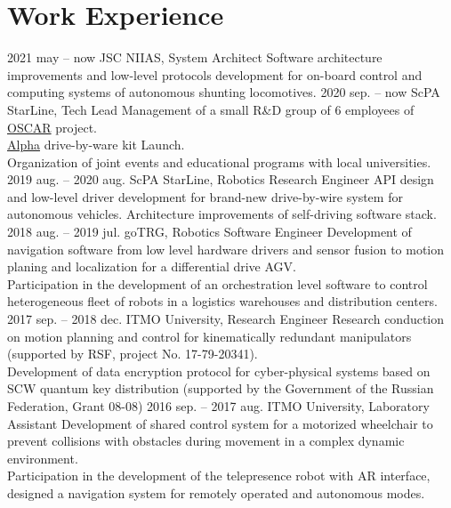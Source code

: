 \documentclass{ncv}
\begin{document}
\section{Work Experience}
\begin{two_col_entry_list}
    \entryh
		{2021 may -- now}
		{JSC NIIAS, System Architect}
		{}
		{Software architecture improvements and low-level protocols development for on-board control and computing systems of autonomous shunting locomotives.
		}
    \entryh
		{2020 sep. -- now}
		{ScPA StarLine, Tech Lead}
		{}
		{Management of a small R\&D group of 6 employees of \textcolor{MidnightBlue}{\href{https://smartcar.starline.ru/en/oscar-en}{OSCAR}} project.\\[1.5mm]
		\textcolor{MidnightBlue}{\href{https://alpha.starline.ru/}{Alpha}} drive-by-ware kit Launch.\\[1.5mm]
		Organization of joint events and educational programs with local universities.
		}
    \entryh
		{2019 aug. -- 2020 aug.}
		{ScPA StarLine, Robotics Research Engineer}
		{}
		{API design and low-level driver development for brand-new drive-by-wire system for autonomous vehicles. Architecture improvements of self-driving software stack.
		}
    \entryh
		{2018 aug. -- 2019 jul.}
		{goTRG, Robotics Software Engineer}
		{}
		{Development of navigation software from low level hardware drivers and sensor fusion to motion planing and localization for a differential drive AGV.\\[1.5mm]
		Participation in the development of an orchestration level software to control heterogeneous fleet of robots in a logistics warehouses and distribution centers.
		}
    \entryh
		{2017 sep. -- 2018 dec.}
		{ITMO University, Research Engineer}
		{}
		{Research conduction on motion planning and control for kinematically redundant manipulators (supported by RSF, project No. 17-79-20341).\\[1.5mm] 
		Development of data encryption protocol for cyber-physical systems based on SCW quantum key distribution (supported by the Government of the Russian Federation, Grant 08-08) 
		}
	\entryh
		{2016 sep. -- 2017 aug.}
		{ITMO University, Laboratory Assistant}
		{}
		{Development of shared control system for a motorized wheelchair to  prevent collisions with obstacles during movement in a complex dynamic environment.\\[1.5mm]
		Participation in the development of the telepresence robot with AR interface, designed a navigation system for remotely operated and autonomous modes.}
\end{two_col_entry_list}
\end{document}

